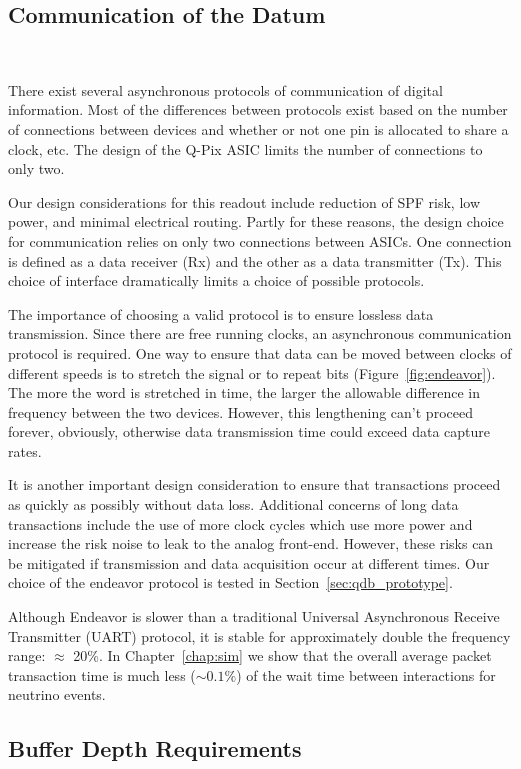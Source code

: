 \subsection{Communication of the Datum}~\label{sec:comms}

There exist several asynchronous protocols of communication of digital information.
Most of the differences between protocols exist based on the number of connections between devices and whether or not one pin is allocated to share a clock, etc.
The design of the Q-Pix ASIC limits the number of connections to only two.

Our design considerations for this readout include reduction of SPF risk, low power, and minimal electrical routing.
Partly for these reasons, the design choice for communication relies on only two connections between ASICs.
One connection is defined as a data receiver (Rx) and the other as a data transmitter (Tx).
This choice of interface dramatically limits a choice of possible protocols.

The importance of choosing a valid protocol is to ensure lossless data transmission.
Since there are free running clocks, an asynchronous communication protocol is required.
One way to ensure that data can be moved between clocks of different speeds is to stretch the signal or to repeat bits (Figure~\ref{fig:endeavor}).
The more the word is stretched in time, the larger the allowable difference in frequency between the two devices.
However, this lengthening can't proceed forever, obviously, otherwise data transmission time could exceed data capture rates.

It is another important design consideration to ensure that transactions proceed as quickly as possibly without data loss.
Additional concerns of long data transactions include the use of more clock cycles which use more power and increase the risk noise to leak to the analog front-end.
However, these risks can be mitigated if transmission and data acquisition occur at different times.
Our choice of the endeavor protocol is tested in Section~\ref{sec:qdb_prototype}.

Although Endeavor is slower than a traditional Universal Asynchronous Receive Transmitter (UART) protocol, it is stable for approximately double the frequency range: $\approx$ 20\%.
In Chapter~\ref{chap:sim} we show that the overall average packet transaction time is much less ($\sim 0.1\%$) of the wait time between interactions for neutrino events.

\subsection{Buffer Depth Requirements}~\label{sec:buffer_requirements}

